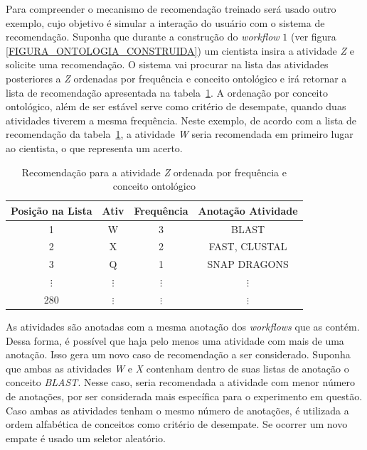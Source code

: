 Para compreender o mecanismo de recomendação treinado será usado outro exemplo, cujo objetivo é simular a interação do usuário com o sistema de recomendação. Suponha que durante a construção do \emph{workflow} \(1\) (ver figura \ref{FIGURA_ONTOLOGIA_CONSTRUIDA}) um cientista insira a atividade \emph{Z} e solicite uma recomendação. O sistema vai procurar na lista das atividades posteriores a \emph{Z} ordenadas por frequência e conceito ontológico e irá retornar a lista de recomendação apresentada na tabela~\ref{tabela_lista_recomendacao_ordenada_frequencia}. A ordenação por conceito ontológico, além de ser estável serve como critério de desempate, quando duas atividades tiverem a mesma frequência. Neste exemplo, de acordo com a lista de recomendação da tabela~\ref{tabela_lista_recomendacao_ordenada_frequencia}, a atividade \emph{W} seria recomendada em primeiro lugar ao cientista, o que representa um acerto.
\begin{table}[!htb]
	\centering
	\caption{Recomendação para a atividade \emph{Z} ordenada por frequência e conceito ontológico}
		\begin{tabular}{|c|c|c|c|}  \hline
		\textbf{Posição na Lista} & \textbf{Ativ} & \textbf{Frequência} & \textbf{Anotação Atividade} 	\\ \hline
		1				& W 				& 3 				& BLAST				\\ \hline
		2				& X 				& 2 				& FAST, CLUSTAL		\\ \hline
		3				& Q 				& 1 				& SNAP DRAGONS		\\ \hline
		\(\vdots\)		& \(\vdots\)		& \(\vdots\) 		& \(\vdots\)		\\ \hline
		280				& \(\vdots\)		& \(\vdots\)		& \(\vdots\)	\\ \hline
		\end{tabular}
	\label{tabela_lista_recomendacao_ordenada_frequencia}
	\vspace{0.1cm}
	\source{\varAutorData}
\end{table}

As atividades são anotadas com a mesma anotação dos \emph{workflows} que as contém. Dessa forma, é possível que haja pelo menos uma atividade com mais de uma anotação. Isso gera um novo caso de recomendação a ser considerado. Suponha que ambas as atividades \emph{W} e \emph{X} contenham dentro de suas listas de anotação o conceito \emph{BLAST}. Nesse caso, seria recomendada a atividade com menor número de anotações, por ser considerada mais específica para o experimento em questão. Caso ambas as atividades tenham o mesmo número de anotações, é utilizada a ordem alfabética de conceitos como critério de desempate. Se ocorrer um novo empate é usado um seletor aleatório.